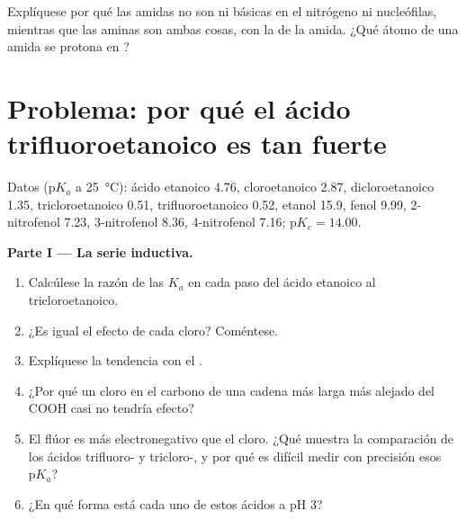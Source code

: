 \begin{exercise}[$\star\star\star$]\label{exo:b1:electronic-effects:12}
Explíquese por qué las amidas no son ni básicas en el nitrógeno ni
nucleófilas, mientras que las aminas son ambas cosas, con la  de la amida. ¿Qué átomo de una amida se protona en ?
\end{exercise}

\section{Problema: por qué el ácido trifluoroetanoico es tan fuerte}

\begin{problem}
\label{pb:b1:electronic-effects:1}
Datos ($\mathrm{p}K_a$ a \qty{25}{\celsius}): ácido etanoico 4.76,
cloroetanoico 2.87, dicloroetanoico 1.35, tricloroetanoico 0.51,
trifluoroetanoico 0.52, etanol 15.9, fenol 9.99, 2-nitrofenol 7.23,
3-nitrofenol 8.36, 4-nitrofenol 7.16; $\mathrm{p}K_e = 14.00$.

\medskip
\noindent\textbf{Parte I --- La serie inductiva.}
\begin{enumerate}
  \item Calcúlese la razón de las $K_a$ en cada paso del ácido etanoico al
        tricloroetanoico.
  \item ¿Es igual el efecto de cada cloro? Coméntese.
  \item Explíquese la tendencia con el .
  \item ¿Por qué un cloro en el carbono de una cadena más larga más
        alejado del COOH casi no tendría efecto?
  \item El flúor es más electronegativo que el cloro. ¿Qué muestra la
        comparación de los ácidos trifluoro- y tricloro-, y por qué es
        difícil medir con precisión esos $\mathrm{p}K_a$?
  \item ¿En qué forma está cada uno de estos ácidos a pH 3?
\end{enumerate}


\end{problem}
